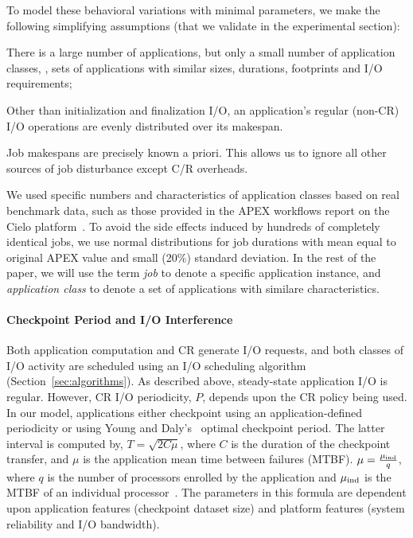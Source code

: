To model these behavioral variations with minimal parameters, we make the following
simplifying assumptions (that we validate in the experimental section):
\begin{compactitem}
\item There is a large number of applications, but only a small number of application
  classes, \ie, sets of applications with similar sizes, durations, footprints and
  I/O requirements;
\item Other than initialization and finalization I/O, an application's regular
  (non-CR) I/O operations are evenly distributed over its makespan.
\item Job makespans are precisely known a priori. This allows us to ignore all other
  sources of job disturbance except C/R overheads.
\end{compactitem}
We used specific numbers and characteristics of application classes
based on real benchmark data, such as those provided in the APEX
workflows report on the Cielo platform~\cite{apex2016}.  To avoid the
side effects induced by hundreds of completely identical jobs, 
we use normal distributions for job durations with mean
equal to original APEX value and small (20\%) standard deviation. In
the rest of the paper, we will use the term \emph{job} to denote a
specific application instance, and \emph{application class} to denote
a set of applications with similare characteristics.

\paragraph*{Checkpoint Period and I/O Interference}

Both application computation and CR generate I/O requests, and both classes of I/O
activity are scheduled using an I/O scheduling algorithm (Section~\ref{sec:algorithms}). As
described above, steady-state application I/O is regular. However, CR I/O
periodicity, $P$, depends
upon the CR policy being used.  In our model, applications either checkpoint using an
application-defined periodicity or using Young and
Daly's~\cite{young74,daly04} optimal checkpoint period. The latter interval is
computed by, $T=\sqrt{2 C \mu}$, where $C$ is the duration of the checkpoint
transfer, and $\mu$ is the application mean time between failures (MTBF).
$\mu = \frac{\mu_{\text{ind}}}{q}$, where $q$ is the number of processors enrolled by the
application and $\mu_{\text{ind}}$ is the MTBF of an individual
processor~\cite{springer-monograph}.  The parameters in this formula are dependent
upon application features (checkpoint dataset size) and platform features (system
reliability and I/O bandwidth).

